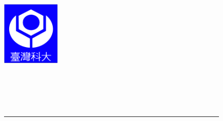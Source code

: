%
\begin{titlepage}
%
\begin{center}		%


\begin{figure}[htbp]
	\begin{minipage}[b]{5cm} 
		\raggedright
		\includegraphics[width=1.1in]{frontpages/ntust_logo.pdf}
		\label{fig:ntust_logo}
	\end{minipage}%
	\begin{minipage}[b]{0.5\textwidth} 
	\centering
	\makebox[3cm][c]{\Huge{\univCname}}\\	%
	\vspace{0.5cm}
	\makebox[3cm][c]{\Huge{\deptCname}}\\	%
	\vspace{0.5cm}
	\end{minipage}%
\\ 
\rule{16cm}{3pt}
\end{figure}

\vspace{1cm}
\\	%
\vspace{1cm}

\renewcommand{\baselinestretch}{1}		%

%
\vspace{1cm}
%
\Large{\eTitle}\\	%
\vspace{5cm}


\end{center}
\end{titlepage}
